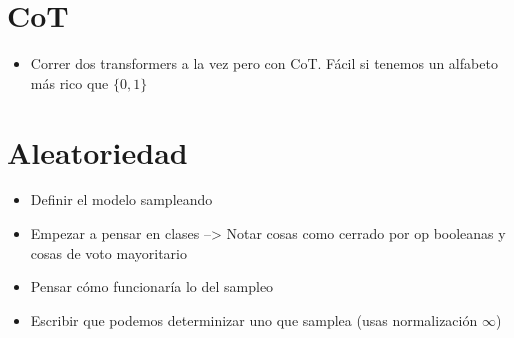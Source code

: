 \documentclass{article}
\begin{document}
\section{CoT}

\begin{itemize}
    \item Correr dos transformers a la vez pero con CoT. Fácil si tenemos un alfabeto más rico que $\{0,1\}$
\end{itemize}



\section{Aleatoriedad}
\begin{itemize}
    \item Definir el modelo sampleando
    \item Empezar a pensar en clases --> Notar cosas como cerrado por op booleanas y cosas de voto mayoritario
    \item Pensar cómo funcionaría lo del sampleo
    \item Escribir que podemos determinizar uno que samplea (usas normalización $\infty$)
\end{itemize}
\end{document}
